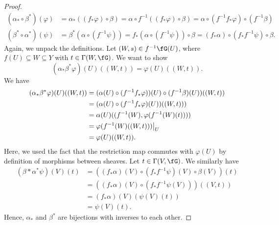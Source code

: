 \documentclass[a4paper]{article}
\begin{document}
\begin{enumerate} [label=\textbf{\arabic*.}, leftmargin=0em]
\begin{proof}
\begin{align*}
                  (\alpha_* \circ \beta^*)(\varphi) & = \alpha_*((f_* \varphi) \circ \beta) = \alpha \circ f^{-1}((f_* \varphi) \circ \beta) = \alpha \circ (f^{-1} f_* \varphi) \circ (f^{-1} \beta) \\
                  (\beta^* \circ \alpha^*)(\psi)    & = \beta^*(\alpha \circ (f^{-1} \psi)) = f_*(\alpha \circ (f^{-1}\psi)) \circ \beta = (f_* \alpha) \circ (f_*f^{-1} \psi) \circ \beta.
              \end{align*}
              Again, we unpack the definitions. Let $(W, s) \in f^{-1} \fG(U)$, where $f(U) \subseteq W \subseteq Y$ with $t \in \Gamma(W, \fG)$. We want to show
              \begin{equation*}
                  (\alpha_*\beta^*\varphi)(U)((W, t)) = \varphi(U)((W, t)).
              \end{equation*}
              We have
              \begin{align*}
                  (\alpha_*\beta^*\varphi)(U)((W, t)) & = (\alpha(U) \circ (f^{-1}f_* \varphi))(U) \circ (f^{-1} \beta)(U))((W, t)) \\
                                                      & = (\alpha(U) \circ (f^{-1}f_*\varphi)(U))((W, t)))                          \\
                                                      & = \alpha(U)((f^{-1}(W), \varphi(f^{-1}(W)(t))))                             \\
                                                      & = \restr{\varphi(f^{-1}(W)((W, t)))}{U}                                     \\
                                                      & = \varphi(U)((W, t)).
              \end{align*}
              Here, we used the fact that the restriction map commutes with $\varphi(U)$ by definition of morphisms between sheaves. Let $t \in \Gamma(V, \fG)$. We similarly have
              \begin{align*}
                  (\beta*\alpha^*\psi)(V)(t) & = ((f_*\alpha)(V) \circ (f_*f^{-1}\psi)(V) \circ \beta(V))(t) \\
                                             & = ((f_*\alpha)(V) \circ (f_*f^{-1}\psi(V)))((V, t))           \\
                                             & = (f_*\alpha)(V)(\psi(V)(t))                                  \\
                                             & = \psi(V)(t).
              \end{align*}
              Hence, $\alpha_*$ and $\beta^*$ are bijections with inverses to each other.
          \end{proof}


\end{enumerate}
\end{document}
